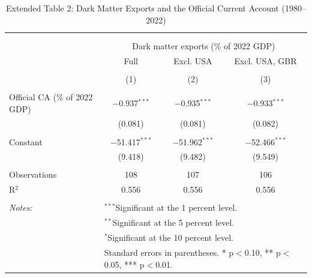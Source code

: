\documentclass[11pt]{article}
\begin{document}
\small
\setcounter{table}{1}

\renewcommand{\thetable}{E2}
\begin{table}[!htbp] \centering 
  \caption{Extended Table 2: Dark Matter Exports and the Official Current Account (1980--2022)} 
  \label{tab:E2_extended_DM_exports_vs_CA} 
\begin{tabular}{@{\extracolsep{5pt}}lccc} 
\\[-1.8ex]\hline 
\hline \\[-1.8ex] 
\\[-1.8ex] & \multicolumn{3}{c}{Dark matter exports (\% of 2022 GDP)} \\ 
 & Full & Excl. USA & Excl. USA, GBR \\ 
\\[-1.8ex] & (1) & (2) & (3)\\ 
\hline \\[-1.8ex] 
 Official CA (\% of 2022 GDP) & $-$0.937$^{***}$ & $-$0.935$^{***}$ & $-$0.933$^{***}$ \\ 
  & (0.081) & (0.081) & (0.082) \\ 
  & & & \\ 
 Constant & $-$51.417$^{***}$ & $-$51.962$^{***}$ & $-$52.466$^{***}$ \\ 
  & (9.418) & (9.482) & (9.549) \\ 
  & & & \\ 
Observations & 108 & 107 & 106 \\ 
R$^{2}$ & 0.556 & 0.556 & 0.556 \\ 
\hline \\[-1.8ex] 
\textit{Notes:} & \multicolumn{3}{l}{$^{***}$Significant at the 1 percent level.} \\ 
 & \multicolumn{3}{l}{$^{**}$Significant at the 5 percent level.} \\ 
 & \multicolumn{3}{l}{$^{*}$Significant at the 10 percent level.} \\ 
 & \multicolumn{3}{l}{Standard errors in parentheses. * p$<$0.10, ** p$<$0.05, *** p$<$0.01.} \\ 
\end{tabular} 
\end{table} 
\end{document}
